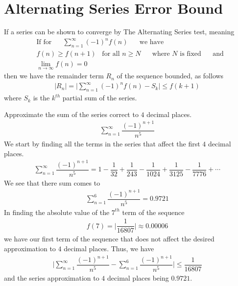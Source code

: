 \section{Alternating Series Error Bound}

\begin{theorem}
If a series can be shown to converge by The Alternating Series test, meaning
\begin{align*}
    &\text{If for} \hspace{20pt} \sum_{n=1}^{\infty} (-1)^{n}f(n) \hspace{20pt} \text{we have}\\[2ex]
    &f(n) \geq f(n+1) \hspace{10pt} \text{for all} \hspace{4pt} n \geq N \hspace{20pt} \text{where} \hspace{4pt} N \hspace{4pt} \text{is fixed} \hspace{20pt} \text{and}\\[2ex]
    &\lim_{n \longrightarrow \infty} f(n) = 0
\end{align*}
then we have the remainder term $R_{n}$ of the sequence bounded, as follows
\begin{align*}
    \lvert R_{n} \rvert = \Big\lvert \sum_{n=1}^{\infty} (-1)^{n} f(n) - S_{k} \Big\rvert \leq f(k+1)
\end{align*}
where $S_{k}$ is the $k^{th}$ partial sum of the series.
\end{theorem}

\begin{example}
Approximate the sum of the series correct to $4$ decimal places.
\begin{align*}
    \sum_{n=1}^{\infty} \dfrac{(-1)^{n+1}}{n^{5}}
\end{align*}
We start by finding all the terms in the series that affect the first $4$ decimal places.
\begin{align*}
    \sum_{n=1}^{\infty} \dfrac{(-1)^{n+1}}{n^{5}} = 1 - \dfrac{1}{32} + \dfrac{1}{243} - \dfrac{1}{1024} + \dfrac{1}{3125} - \dfrac{1}{7776} + \cdots
\end{align*}
We see that there sum comes to 
\begin{align*}
    \sum_{n = 1}^{6} \dfrac{(-1)^{n+1}}{n^{5}} = 0.9721
\end{align*}
In finding the absolute value of the $7^{th}$ term of the sequence
\begin{align*}
    f(7) = \Big\lvert \dfrac{1}{16807} \Big\rvert \approx 0.00006 
\end{align*}
we have our first term of the sequence that does not affect the desired approximation to $4$ decimal places. Thus, we have
\begin{align*}
    \Big\lvert \sum_{n=1}^{\infty} \dfrac{(-1)^{n+1}}{n^{5}} - \sum_{n = 1}^{6} \dfrac{(-1)^{n+1}}{n^{5}} \Big\rvert \leq \dfrac{1}{16807}
\end{align*}
and the series approximation to $4$ decimal places being $0.9721$. 
\end{example}